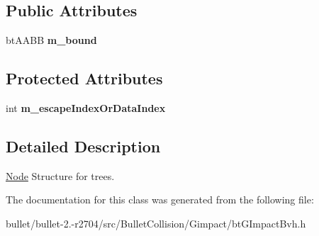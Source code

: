 \subsection*{Public Attributes}
\begin{DoxyCompactItemize}
\item 
\hypertarget{class_g_i_m___b_v_h___t_r_e_e___n_o_d_e_a28198387573401c0d86c036aec105b81}{bt\+A\+A\+B\+B {\bfseries m\+\_\+bound}}\label{class_g_i_m___b_v_h___t_r_e_e___n_o_d_e_a28198387573401c0d86c036aec105b81}

\end{DoxyCompactItemize}
\subsection*{Protected Attributes}
\begin{DoxyCompactItemize}
\item 
\hypertarget{class_g_i_m___b_v_h___t_r_e_e___n_o_d_e_ac56b386b685e01f9ae8ccd7d497d3264}{int {\bfseries m\+\_\+escape\+Index\+Or\+Data\+Index}}\label{class_g_i_m___b_v_h___t_r_e_e___n_o_d_e_ac56b386b685e01f9ae8ccd7d497d3264}

\end{DoxyCompactItemize}


\subsection{Detailed Description}
\hyperlink{struct_node}{Node} Structure for trees. 

The documentation for this class was generated from the following file\+:\begin{DoxyCompactItemize}
\item 
bullet/bullet-\/2.-\/r2704/src/\+Bullet\+Collision/\+Gimpact/bt\+G\+Impact\+Bvh.\+h\end{DoxyCompactItemize}
